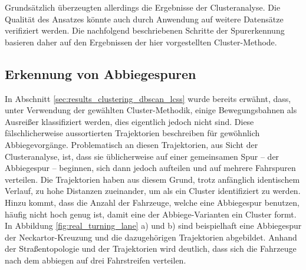 Grundsätzlich überzeugten allerdings die Ergebnisse der Clusteranalyse. Die Qualität des Ansatzes könnte auch
durch Anwendung auf weitere Datensätze verifiziert werden. Die nachfolgend beschriebenen Schritte der Spurerkennung
basieren daher auf den Ergebnissen der hier vorgestellten Cluster-Methode.

\subsection{Erkennung von Abbiegespuren}
\label{sec:real_detect_turning_lane}

In Abschnitt \ref{sec:results_clustering_dbscan_lcss} wurde bereits erwähnt, dass, unter Verwendung der
gewählten Cluster-Methodik, einige Bewegungsbahnen als Ausreißer klassifiziert werden, dies eigentlich jedoch
nicht sind. Diese fälschlicherweise aussortierten Trajektorien beschreiben für gewöhnlich Abbiegevorgänge.
Problematisch an diesen Trajektorien, aus Sicht der Clusteranalyse, ist, dass sie üblicherweise auf einer
gemeinsamen Spur -- der Abbiegespur -- beginnen, sich dann jedoch aufteilen und auf mehrere Fahrspuren verteilen.
Die Trajektorien haben aus diesem Grund, trotz anfänglich identischem Verlauf, zu hohe Distanzen zueinander, um
als ein Cluster identifiziert zu werden. Hinzu kommt, dass die Anzahl der Fahrzeuge, welche eine Abbiegespur
benutzen, häufig nicht hoch genug ist, damit eine der Abbiege-Varianten ein Cluster formt. 
In Abbildung \ref{fig:real_turning_lane} a) und b) sind beispielhaft eine Abbiegespur der Neckartor-Kreuzung und
die dazugehörigen Trajektorien abgebildet. Anhand der Straßentopologie und der Trajektorien wird deutlich,
dass sich die Fahrzeuge nach dem abbiegen auf drei Fahrstreifen verteilen.

